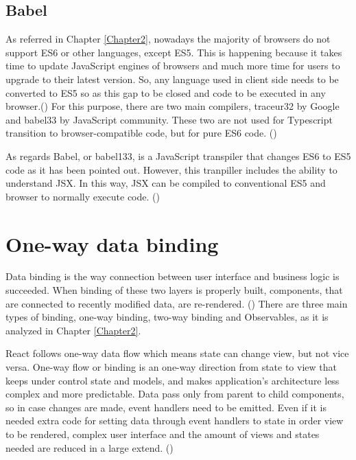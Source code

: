 \subsection{Babel}

As referred in Chapter \ref{Chapter2}, nowadays the majority of browsers do not support ES6 or other languages, except ES5. This is happening because it takes time to update JavaScript engines of browsers and much more time for users to upgrade to their latest version. So, any language used in client side needs to be converted to ES5 so as this gap to be closed and code to be executed in any browser.(\cite{Reference10}) For this purpose, there are two main compilers, traceur32 by Google and babel33 by JavaScript community. These two are not used for Typescript transition to browser-compatible code, but for pure ES6 code. (\cite{murray2018ng})

As regards Babel, or babel133, is a JavaScript transpiler that changes ES6 to ES5 code as it has been pointed out. However, this tranpiller includes the ability to understand JSX. In this way, JSX can be compiled to conventional ES5 and browser to normally execute code.  (\cite{Reference10})

\section{One-way data binding}
 
Data binding is the way connection between user interface and business logic is succeeded. When binding of these two layers is properly built, components, that are connected to recently modified data, are re-rendered. (\cite{Reference21}) There are three main types of binding, one-way binding, two-way binding and Observables, as it is analyzed in Chapter \ref{Chapter2}. \par

React follows one-way data flow which means state can change view, but not vice versa. One-way flow or binding is an one-way direction from state to view that keeps under control state and models, and makes application's architecture less complex and more predictable. Data pass only from parent to child components, so in case changes are made, event handlers need to be emitted. Even if it is needed extra code for setting data through event handlers to state in order view to be rendered, complex user interface and the amount of views and states needed are reduced in a large extend. (\cite{reactQuickly}) \par

